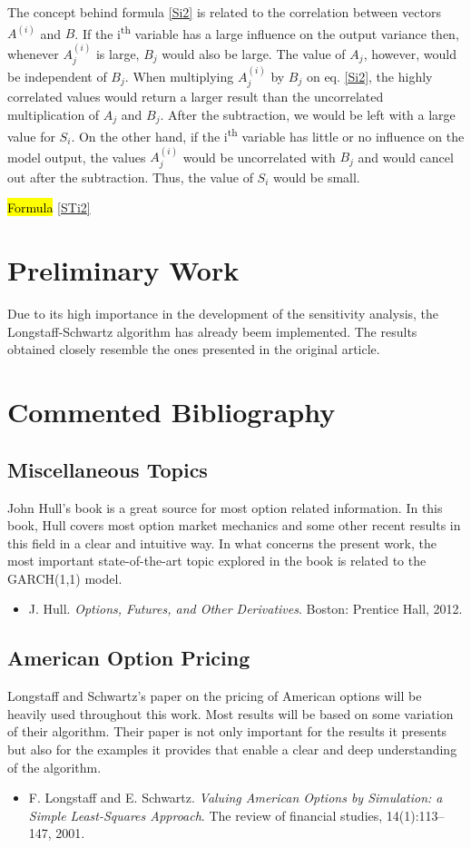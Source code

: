 \documentclass[a4paper,twocolumn,aps,prd,longbibliography,superscriptaddress]{revtex4-1}
\begin{document}
The concept behind formula \eqref{Si2} is related to the correlation between vectors $A^{(i)}$ and $B$. If the i\textsuperscript{th} variable has a large influence on the output variance then, whenever $A^{(i)}_j$ is large, $B_j$ would also be large. The value of $A_j$, however, would be independent of $B_j$. When multiplying $A^{(i)}_j$ by $B_j$ on eq. \eqref{Si2}, the highly correlated values would return a larger result than the uncorrelated multiplication of $A_j$ and $B_j$. After the subtraction, we would be left with a large value for $S_i$.
On the other hand, if the i\textsuperscript{th} variable has little or no influence on the model output, the values $A^{(i)}_j$ would be uncorrelated with $B_j$ and would cancel out after the subtraction. Thus, the value of $S_i$ would be small.

\hl{Formula }\eqref{STi2}

\section{Preliminary Work}
Due to its high importance in the development of the sensitivity analysis, the Longstaff-Schwartz algorithm has already beem implemented. The results obtained closely resemble the ones presented in the original article\cite{Longstaff}.

\section{Commented Bibliography}
\subsection{Miscellaneous Topics}

John Hull's book is a great source for most option related information. In this book, Hull covers most option market mechanics and some other recent results in this field in a clear and intuitive way.
In what concerns the present work, the most important state-of-the-art topic explored in the book is related to the GARCH(1,1) model.
\begin{itemize}
\item J. Hull. \textit{Options, Futures, and Other Derivatives}. Boston: Prentice Hall, 2012.
\end{itemize}

\subsection{American Option Pricing}
Longstaff and Schwartz's paper on the pricing of American options will be heavily used throughout this work. Most results will be based on some variation of their algorithm. Their paper is not only important for the results it presents but also for the examples it provides that enable a clear and deep understanding of the algorithm.
\begin{itemize}
\item  F. Longstaff and E. Schwartz. \textit{Valuing American Options by Simulation: a Simple Least-Squares Approach}. The review of financial studies, 14(1):113–147, 2001.
\end{itemize}
\end{document}
